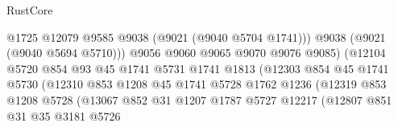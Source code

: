 \begin{lexlean}{RustCore}
\begin{coremodule}
                                            @1725
                                            @12079
                                            @9585
                                            @9038
                                            (@9021 (@9040 @5704 @1741)))
                                          @9038
                                          (@9021 (@9040 @5694 @5710)))
                                        @9056
                                        @9060
                                        @9065
                                        @9070
                                        @9076
                                        @9085)
                                      (@12104
                                        @5720
                                        @854
                                        @93
                                        @45
                                        @1741
                                        @5731
                                        @1741
                                        @1813
                                        (@12303
                                          @854
                                          @45
                                          @1741
                                          @5730
                                          (@12310
                                            @853
                                            @1208
                                            @45
                                            @1741
                                            @5728
                                            @1762
                                            @1236
                                            (@12319
                                              @853
                                              @1208
                                              @5728
                                              (@13067
                                                @852
                                                @31
                                                @1207
                                                @1787
                                                @5727
                                                @12217
                                                (@12807
                                                  @851
                                                  @31
                                                  @35
                                                  @3181
                                                  @5726

\end{coremodule}
\end{lexlean}
